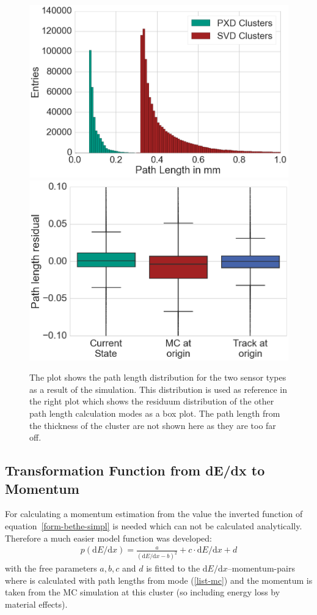 \begin{figure}
 \centering
 \includegraphics[width=0.48\linewidth]{figures/vxd/pathLengths.png}
 \includegraphics[width=0.48\linewidth]{figures/vxd/box_plot.png}
 \caption[Path length distribution for the two sensor types.]{The plot shows the path length distribution for the two sensor types as a result of the simulation. This distribution is used as reference in the right plot which shows the residuum distribution of the other path length calculation modes as a box plot\footnotemark. The path length from the thickness of the cluster are not shown here as they are too far off.}
 \label{fig-pathlengths}
\end{figure}

\subsection{Transformation Function from dE/dx to Momentum} \label{subsection-transform}

For calculating a momentum estimation from the \dedx value the inverted function of equation~\ref{form-bethe-simpl} is needed which can not be calculated analytically. Therefore a much easier model function was developed:
\begin{align}
 p(\mathrm{d}E/\mathrm{d} x) = \frac{a}{(\mathrm{d}E/\mathrm{d} x - b)^2} + c \cdot \mathrm{d}E/\mathrm{d} x + d \label{form-model}
\end{align}
with the free parameters $a, b, c$ and $d$ is fitted to the $\mathrm d E / \mathrm d x$--momentum-pairs where \dedx is calculated with path lengths from mode (\ref{list-mc}) and the momentum is taken from the MC simulation at this cluster (so including energy loss by material effects).


